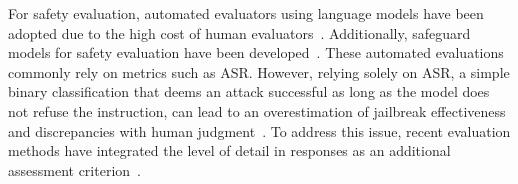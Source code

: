 For safety evaluation, automated evaluators using language models have been adopted due to the high cost of human evaluators~\cite{vlguard2024, jailbreak28k2024, mmsafetybench2025, spavl2024, rtvlm2024}. Additionally, safeguard models for safety evaluation have been developed~\cite{inan2023llamaguard, chi2024llamaguardvision, mllmguard2024}. These automated evaluations commonly rely on metrics such as ASR. However, relying solely on ASR, a simple binary classification that deems an attack successful as long as the model does not refuse the instruction, can lead to an overestimation of jailbreak effectiveness and discrepancies with human judgment~\cite{strongreject2024}. To address this issue, recent evaluation methods have integrated the level of detail in responses as an additional assessment criterion~\cite{strongreject2024, o12024, guan2024deliberative}. 
